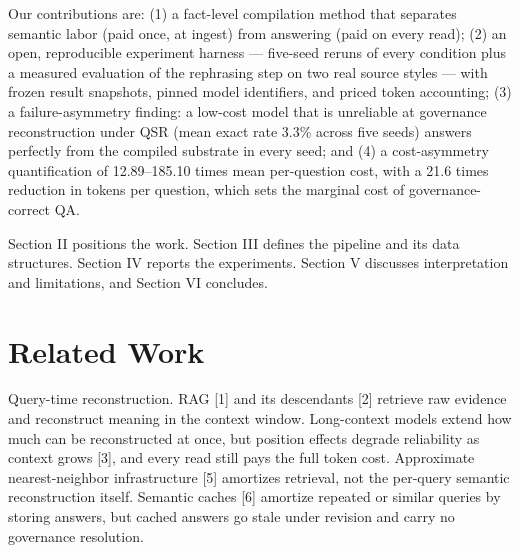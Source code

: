 \documentclass[conference,a4paper]{IEEEtran}
\begin{document}
Our contributions are: (1) a fact-level compilation method that separates semantic labor (paid once, at ingest) from answering (paid on every read); (2) an open, reproducible experiment harness --- five-seed reruns of every condition plus a measured evaluation of the rephrasing step on two real source styles --- with frozen result snapshots, pinned model identifiers, and priced token accounting; (3) a failure-asymmetry finding: a low-cost model that is unreliable at governance reconstruction under QSR (mean exact rate 3.3\% across five seeds) answers perfectly from the compiled substrate in every seed; and (4) a cost-asymmetry quantification of 12.89--185.10 times mean per-question cost, with a 21.6 times reduction in tokens per question, which sets the marginal cost of governance-correct QA.

Section II positions the work. Section III defines the pipeline and its data structures. Section IV reports the experiments. Section V discusses interpretation and limitations, and Section VI concludes.

\section{Related Work}

Query-time reconstruction. RAG [1] and its descendants [2] retrieve raw evidence and reconstruct meaning in the context window. Long-context models extend how much can be reconstructed at once, but position effects degrade reliability as context grows [3], and every read still pays the full token cost. Approximate nearest-neighbor infrastructure [5] amortizes retrieval, not the per-query semantic reconstruction itself. Semantic caches [6] amortize repeated or similar queries by storing answers, but cached answers go stale under revision and carry no governance resolution.
\end{document}
